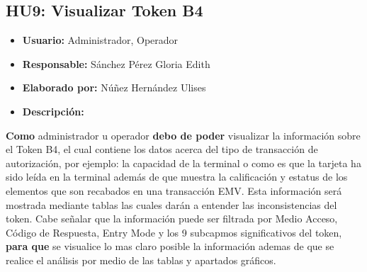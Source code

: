 \subsection{HU9: Visualizar Token B4}
\begin{itemize}
	\item \textbf{Usuario:} Administrador, Operador
	\item \textbf{Responsable:} Sánchez Pérez Gloria Edith
	\item \textbf{Elaborado por:} Núñez Hernández Ulises
	\item \textbf{Descripción:}
\end{itemize}
\textbf{Como} administrador u operador \textbf{debo de poder} visualizar la información sobre el Token B4, el cual contiene los datos acerca del tipo de transacción de autorización, por ejemplo: la capacidad de la terminal o como es que la tarjeta ha sido leída en la terminal además de que muestra la calificación y estatus de los elementos que son recabados en una transacción EMV. Esta información será mostrada mediante tablas las cuales darán a entender las inconsistencias del token. Cabe señalar que la información puede ser filtrada por Medio Acceso, Código de Respuesta, Entry Mode y los 9 subcapmos significativos del token, \textbf{para que} se visualice lo mas claro posible la información ademas de que se realice el análisis por medio de las tablas y apartados gráficos.